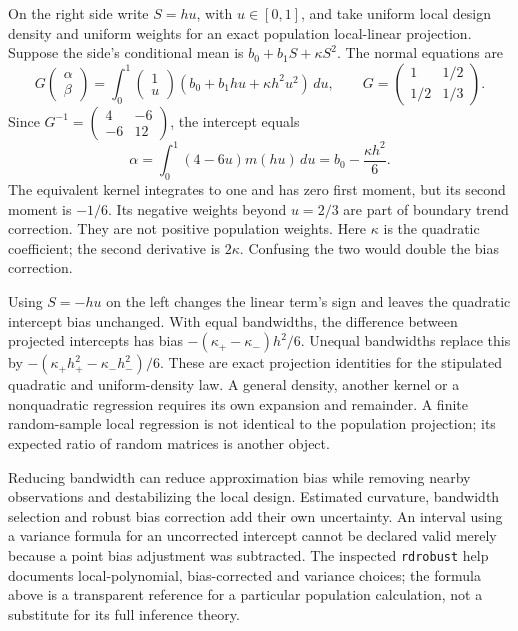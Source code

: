 On the right side write $S=hu$, with $u\in[0,1]$, and take uniform local
design density and uniform weights for an exact population local-linear
projection. Suppose the side's conditional mean is
$b_0+b_1S+\kappa S^2$. The normal equations are
\[
 G\begin{pmatrix}\alpha\\\beta\end{pmatrix}
 =\int_0^1\begin{pmatrix}1\\u\end{pmatrix}
       (b_0+b_1hu+\kappa h^2u^2)\,du,
 \qquad
 G=\begin{pmatrix}1&1/2\\1/2&1/3\end{pmatrix}.
\]
Since $G^{-1}=\left(\begin{smallmatrix}4&-6\\-6&12\end{smallmatrix}\right)$,
the intercept equals
\begin{equation}
 \alpha=\int_0^1(4-6u)m(hu)\,du
        =b_0-\frac{\kappa h^2}{6}.
 \label{exec17:s4-local-bias}
\end{equation}
The equivalent kernel integrates to one and has zero first moment, but its
second moment is $-1/6$. Its negative weights beyond $u=2/3$ are part of
boundary trend correction. They are not positive population weights.
Here $\kappa$ is the quadratic coefficient; the second derivative is
$2\kappa$. Confusing the two would double the bias correction.
\citep{exec17_s4_math}

Using $S=-hu$ on the left changes the linear term's sign and leaves the
quadratic intercept bias unchanged. With equal bandwidths, the difference
between projected intercepts has bias
$-(\kappa_+-\kappa_-)h^2/6$. Unequal bandwidths replace this by
$-(\kappa_+h_+^2-\kappa_-h_-^2)/6$. These are exact projection identities
for the stipulated quadratic and uniform-density law. A general density,
another kernel or a nonquadratic regression requires its own expansion and
remainder. A finite random-sample local regression is not identical to the
population projection; its expected ratio of random matrices is another
object.

Reducing bandwidth can reduce approximation bias while removing nearby
observations and destabilizing the local design. Estimated curvature,
bandwidth selection and robust bias correction add their own uncertainty.
An interval using a variance formula for an uncorrected intercept cannot be
declared valid merely because a point bias adjustment was subtracted. The
inspected \texttt{rdrobust} help documents local-polynomial, bias-corrected
and variance choices; the formula above is a transparent reference for a
particular population calculation, not a substitute for its full inference
theory.~\citep{exec13_ivrd_rdrobust}

